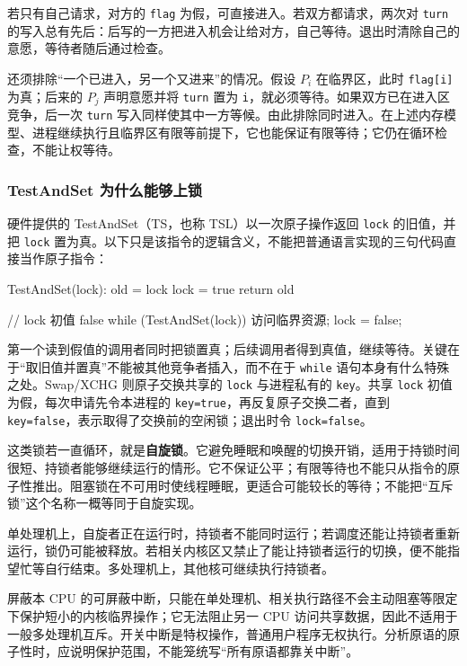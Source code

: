 若只有自己请求，对方的 \texttt{flag} 为假，可直接进入。若双方都请求，两次对 \texttt{turn} 的写入总有先后：后写的一方把进入机会让给对方，自己等待。退出时清除自己的意愿，等待者随后通过检查。

还须排除``一个已进入，另一个又进来''的情况。假设 \(P_i\) 在临界区，此时 \texttt{flag[i]} 为真；后来的 \(P_j\) 声明意愿并将 \texttt{turn} 置为 \texttt{i}，就必须等待。如果双方已在进入区竞争，后一次 \texttt{turn} 写入同样使其中一方等候。由此排除同时进入。在上述内存模型、进程继续执行且临界区有限等前提下，它也能保证有限等待；它仍在循环检查，不能让权等待。

\subsubsection{TestAndSet 为什么能够上锁}\label{OS02-auto-11}

硬件提供的 TestAndSet（TS，也称 TSL）以一次原子操作返回 \texttt{lock} 的旧值，并把 \texttt{lock} 置为真。以下只是该指令的逻辑含义，不能把普通语言实现的三句代码直接当作原子指令：

\begin{codeblock}[language={}]
TestAndSet(lock):
    old = lock
    lock = true
    return old

// lock 初值 false
while (TestAndSet(lock)) { }
访问临界资源;
lock = false;
\end{codeblock}

第一个读到假值的调用者同时把锁置真；后续调用者得到真值，继续等待。关键在于``取旧值并置真''不能被其他竞争者插入，而不在于 \texttt{while} 语句本身有什么特殊之处。Swap/XCHG 则原子交换共享的 \texttt{lock} 与进程私有的 \texttt{key}。共享 \texttt{lock} 初值为假，每次申请先令本进程的 \texttt{key=\allowbreak{}true}，再反复原子交换二者，直到 \texttt{key=\allowbreak{}false}，表示取得了交换前的空闲锁；退出时令 \texttt{lock=\allowbreak{}false}。

这类锁若一直循环，就是\textbf{自旋锁}。它避免睡眠和唤醒的切换开销，适用于持锁时间很短、持锁者能够继续运行的情形。它不保证公平；有限等待也不能只从指令的原子性推出。阻塞锁在不可用时使线程睡眠，更适合可能较长的等待；不能把``互斥锁''这个名称一概等同于自旋实现。

单处理机上，自旋者正在运行时，持锁者不能同时运行；若调度还能让持锁者重新运行，锁仍可能被释放。若相关内核区又禁止了能让持锁者运行的切换，便不能指望忙等自行结束。多处理机上，其他核可继续执行持锁者。

屏蔽本 CPU 的可屏蔽中断，只能在单处理机、相关执行路径不会主动阻塞等限定下保护短小的内核临界操作；它无法阻止另一 CPU 访问共享数据，因此不适用于一般多处理机互斥。开关中断是特权操作，普通用户程序无权执行。分析原语的原子性时，应说明保护范围，不能笼统写``所有原语都靠关中断''。


